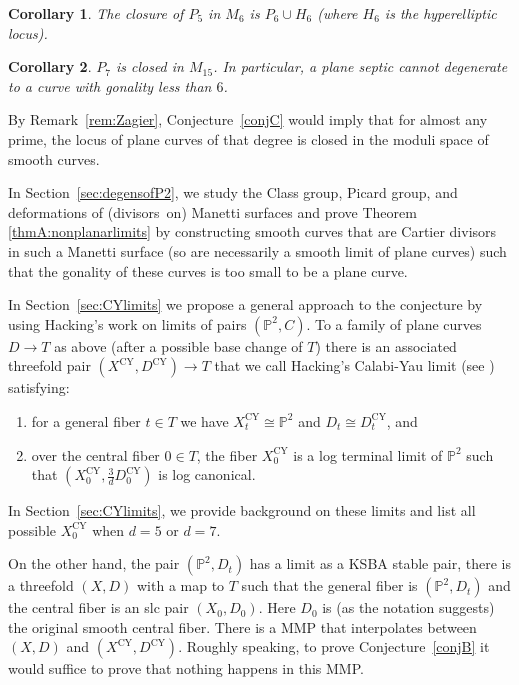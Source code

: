 \documentclass[JEP,XML,SOM,Unicode,NoFloatCountersInSection,published]{cedram}
\theoremstyle{plain}
\newtheorem*{corollary*}{Corollary}
\theoremstyle{definition}
\newcommand\PP{{\mathbb{P}}}
\newcommand\Dcy{{D^{\mathrm{CY}}}}
\newcommand\Dcyo{{D^{\mathrm{CY}}_0}}
\newcommand\Xcy{{X^{\mathrm{CY}}}}
\newcommand\Xcyo{{X^{\mathrm{CY}}_0}}
\begin{document}
\begin{corollary*}
The closure of $P_5$ in $M_6$ is $P_6\cup H_6$ (where $H_6$ is the hyperelliptic locus).
\end{corollary*}

\begin{corollary*}
$P_7$ is closed in $M_{15}$. In particular, a plane septic cannot degenerate to a curve with gonality less than $6$.
\end{corollary*}

By Remark~\ref{rem:Zagier}, Conjecture~\ref{conjC} would imply that for almost any prime, the locus of plane curves of that degree is closed in the moduli space of smooth curves.

In Section~\ref{sec:degensofP2}, we study the Class group, Picard group, and deformations of (divisors~on) Manetti surfaces and prove Theorem \ref{thmA:nonplanarlimits} by constructing smooth curves that are Cartier divisors in such a Manetti surface (so are necessarily a smooth limit of plane curves) such that the gonality of these curves is too small to be a plane curve.

In Section~\ref{sec:CYlimits} we propose a general approach to the conjecture by using Hacking's work \cite{Hacking} on limits of pairs $(\PP^2,C)$. To a family of plane curves $D\to T$ as above (after a possible base change of $T$) there is an associated threefold pair $(\Xcy,\Dcy)\to T$ that we call Hacking's Calabi-Yau limit (see \cite[Def.\,2.4]{Hacking}) satisfying:
\begin{enumerate}
\item for a general fiber $t\in T$ we have $X^{\mathrm{CY}}_t\cong \PP^2$ and $D_t\cong D^{\mathrm{CY}}_t$, and
\item over the central fiber $0\in T$, the fiber $\Xcyo$ is a log terminal limit of $\PP^2$ such that $(\Xcyo, \frac{3}{d} \Dcyo)$ is log canonical.
\end{enumerate}
\noindent In Section~\ref{sec:CYlimits}, we provide background on these limits and list all possible $\Xcyo$ when $d = 5$ or $d = 7$.

On the other hand, the pair $(\PP^2,D_t)$ has a limit as a KSBA stable pair, \ie there is a threefold $(X,D)$ with a map to $T$ such that the general fiber is $(\PP^2,D_t)$ and the central fiber is an slc pair $(X_0,D_0)$. Here $D_0$ is (as the notation suggests) the original smooth central fiber. There is a MMP that interpolates between $(X,D)$ and $(\Xcy,\Dcy)$. Roughly speaking, to prove Conjecture~\ref{conjB} it would suffice to prove that nothing happens in this MMP.
\end{document}
